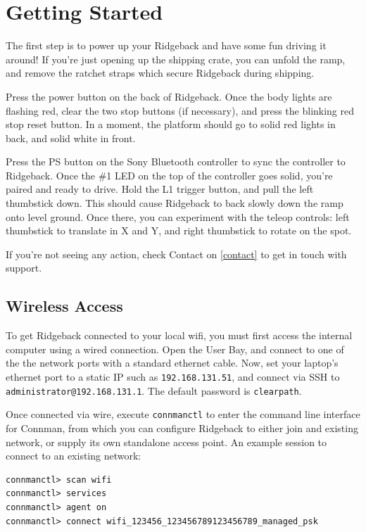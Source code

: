 \documentclass[]{clearpath-latex/clearpath-manual}
\begin{document}
\section{Getting Started}

The first step is to power up your Ridgeback and have some fun driving it around! If you’re just opening up the shipping crate, you can unfold the ramp, and remove the ratchet straps which secure Ridgeback during shipping.

Press the power button on the back of Ridgeback. Once the body lights are flashing red, clear the two stop buttons (if necessary), and press the blinking red stop reset button. In a moment, the platform should go to solid red lights in back, and solid white in front.

Press the PS button on the Sony Bluetooth controller to sync the controller to Ridgeback. Once the \#1 LED on the top of the controller goes solid, you’re paired and ready to drive. Hold the L1 trigger button, and pull the left thumbstick down. This should cause Ridgeback to back slowly down the ramp onto level ground. Once there, you can experiment with the teleop controls: left thumbstick to translate in X and Y, and right thumbstick to rotate on the spot.

If you’re not seeing any action, check Contact on \autoref{contact} to get in touch with support.

\subsection{Wireless Access}

To get Ridgeback connected to your local wifi, you must first access the internal computer using a wired connection. Open the User Bay, and connect to one of the the network ports with a standard ethernet cable. Now, set your laptop’s ethernet port to a static IP such as \lstinline{192.168.131.51}, and connect via SSH to \lstinline{administrator@192.168.131.1}. The default password is \lstinline{clearpath}.

Once connected via wire, execute \lstinline{connmanctl} to enter the command line interface for Connman, from which you can configure Ridgeback to either join and existing network, or supply its own standalone access point. An example session to connect to an existing network:

\begin{lstlisting}
connmanctl> scan wifi
connmanctl> services
connmanctl> agent on
connmanctl> connect wifi_123456_123456789123456789_managed_psk
\end{lstlisting}
\end{document}
